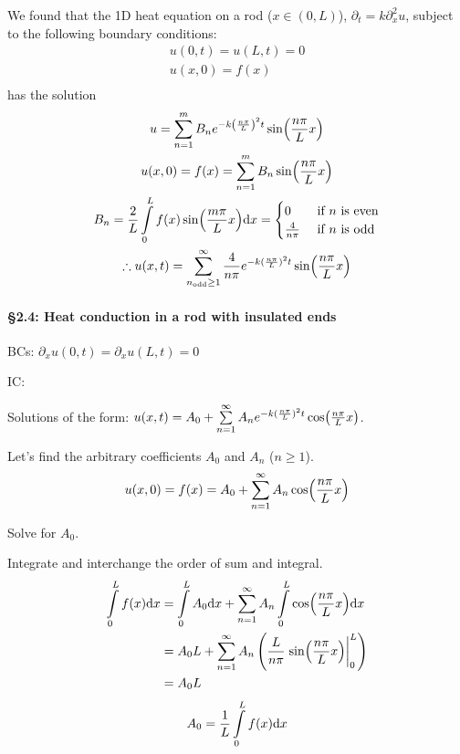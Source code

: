 We found that the 1D heat equation on a rod ($x\in(0,L)$), $\partial_t = k\partial_x^2 u $, subject to the following boundary conditions: 
\begin{gather*}
	u(0,t) = u(L,t) = 0 \\
	u(x, 0) = f(x) \\
\end{gather*}
has the solution 
\begin{gather*}
	u = \sum\limits_{n=1}^m B_n e^{-k \left(\frac{n\pi}{L}\right)^2 t} \sin(\frac{n\pi}{L} x) \\
	u(x, 0) = f(x) = \sum\limits_{n=1}^m B_n \sin(\frac{n\pi}{L} x) \\
	B_n = \frac{2}{L}\int\limits_0^L f(x) \sin(\frac{m\pi}{L} x) \text{d} x = 
		\begin{cases}
			0 &\text{ if $n$ is even} \\
			\frac{4}{n\pi} &\text{ if $n$ is odd}
		\end{cases} \\
  \therefore u(x, t) = \sum\limits_{n_{\text{odd}} \geq 1}^\infty \frac{4}{n\pi} e^{-k (\frac{n\pi}{L})^2 t} \sin(\frac{n\pi}{L} x)
\end{gather*}



\paragraph*{\S 2.4: Heat conduction in a rod with insulated ends}

BCs: $\partial_x u ( 0, t) = \partial_x u (L, t) = 0 $

IC: 

Solutions of the form: $u(x, t) = A_0 + \sum\limits_{n=1}^\infty A_n e^{-k (\frac{n\pi}{L})^2 t} \cos(\frac{n\pi}{L} x)$. 

Let's find the arbitrary coefficients $A_0$ and $A_n$ ($n\geq 1$). 
\begin{equation}
	u(x, 0) = f(x) = A_0 + \sum\limits_{n=1}^\infty A_n \cos (\frac{n\pi}{L} x)
\end{equation}

\begin{quest}
	\item Solve for $A_0$.
\end{quest}

Integrate and interchange the order of sum and integral. 
\[\begin{aligned}
	\int\limits_{0}^L f(x) \d x &
		=  \int\limits_0^L A_0 \d x + \sum\limits_{n=1}^\infty A_n \int\limits_0^L \cos (\npiell x) \d x \\ 
		&= A_0 L + \sum\limits_{n=1}^\infty A_n 
			\left( \frac{L}{n\pi} \eval{\sin(\npiell x)  }_0^L   \right)\\
		&= A_0 L 
\end{aligned} \]
\begin{equation}
	A_0 = \frac{1}{L} \int\limits_0^L f(x) \text{d} x
\end{equation}

